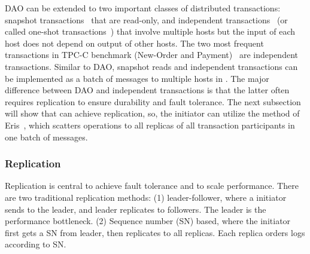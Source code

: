 


DAO can be extended to two important classes of distributed transactions: snapshot transactions~\cite{corbett2013spanner} that are read-only, and independent transactions~\cite{eris} (or called one-shot transactions~\cite{kallman2008h}) that involve multiple hosts but the input of each host does not depend on output of other hosts.
The two most frequent transactions in TPC-C benchmark (New-Order and Payment)~\cite{tpcc} are independent transactions.
Similar to DAO, snapshot reads and independent transactions can be implemented as a batch of messages to multiple hosts in \sys{}.
The major difference between DAO and independent transactions is that the latter often requires replication to ensure durability and fault tolerance.
The next subsection will show that \sys{} can achieve replication, so, the initiator can utilize the method of Eris~\cite{eris}, which scatters operations to all replicas of all transaction participants in one batch of messages.



\subsubsection{Replication}

Replication is central to achieve fault tolerance and to scale performance.
There are two traditional replication methods: (1) leader-follower, where a initiator sends to the leader, and leader replicates to followers. The leader is the performance bottleneck.
(2) Sequence number (SN) based, where the initiator first gets a SN from leader, then replicates to all replicas. Each replica orders logs according to SN. %

